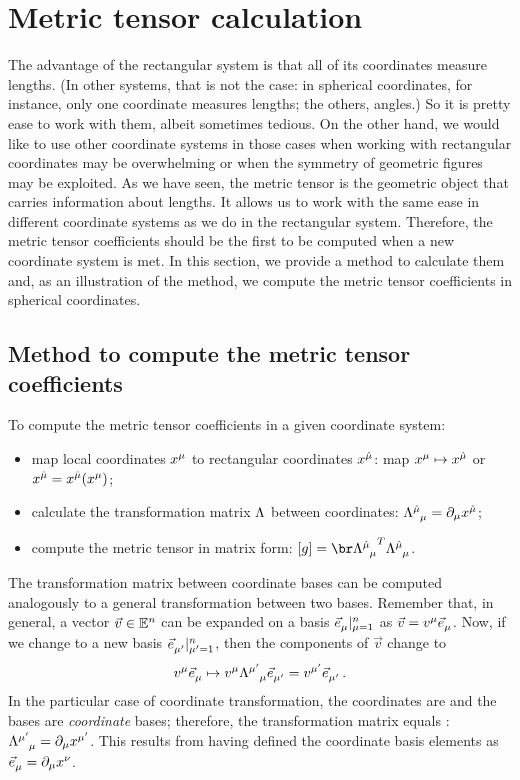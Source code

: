 \section{Metric tensor calculation}
%
 The advantage of the rectangular system is that all of its coordinates measure lengths. (In other systems, that is not the case: in spherical coordinates, for instance, only one coordinate measures lengths; the others, angles.) So it is pretty ease to work with them, albeit sometimes tedious. On the other hand, we would like to use other coordinate systems in those cases when working with rectangular coordinates may be overwhelming or when the symmetry of geometric figures may be exploited. As we have seen, the metric tensor is the geometric object that carries information about lengths. It allows us to work with the same ease in different coordinate systems as we do in the rectangular system. Therefore, the metric tensor coefficients should be the first to be computed when a new coordinate system is met. In this section, we provide a method to calculate them and, as an illustration of the method, we compute the metric tensor coefficients in spherical coordinates.


\subsection{Method to compute the metric tensor coefficients}
%
To compute the metric tensor coefficients in a given coordinate system:
%
\begin{itemize}
  \item map local coordinates $\tvec\pos\mu$ to rectangular coordinates $\tvec\pos{\ridx\mu}$: map $\tvec\pos\mu\mapsto\tvec\pos{\ridx\mu}$ or $\tvec\pos{\ridx\mu} = \tvec\pos{\ridx\mu}\vat{\tvec\pos\mu}$;
  \item calculate the transformation matrix $\Lambda$ between coordinates: $\ttransmat{\ridx\mu}\mu = \ipd\mu\tvec\pos{\ridx\mu}$;
  \item compute the metric tensor in matrix form: $\asmatrix\metric = \trans{\ttransmat{\ridx\mu}\mu}\ttransmat{\ridx\mu}\mu$.
\end{itemize}
%
The transformation matrix between coordinate bases can be computed analogously to a general transformation between two bases. Remember that, in general, a vector $\vec v\in\mathbb{E}^{n}$ can be expanded on a basis $\bset{\tbvec\mu}{\mu = 1}{n}$ as $\vec v = \tvec v\mu\tbvec\mu$. Now, if we change to a new basis $\bset{\tbvec{\aidx\mu}}{\aidx\mu = 1}{n}$, then the components of $\vec v$ change to
%
\begin{equation*}
  \tvec v\mu\tbvec\mu \mapsto \tvec v\mu\ttransmat{\aidx\mu}{\mu}\tbvec{\aidx\mu}
                      = \tvec v{\aidx\mu}\tbvec{\aidx\mu} \,.
\end{equation*}
%
In the particular case of coordinate transformation, the coordinates are  and the bases are \emph{coordinate} bases; therefore, the transformation matrix equals : $\ttransmat{\aidx\mu}{\mu} = \ipd\mu\tvec\pos{\aidx\mu}$. This results from having defined the coordinate basis elements as $\tbvec\mu = \ipd\mu\tvec\pos\nu$.


